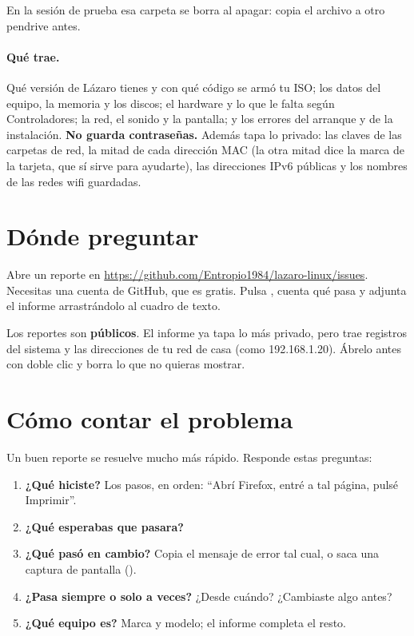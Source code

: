 En la sesión de prueba esa carpeta se borra al apagar: copia el archivo a
otro pendrive antes.

\paragraph{Qué trae.} Qué versión de Lázaro tienes y con qué código se
armó tu ISO; los datos del equipo, la memoria y los discos; el hardware y
lo que le falta según Controladores; la red, el sonido y la pantalla; y
los errores del arranque y de la instalación. \textbf{No guarda
contraseñas.} Además tapa lo privado: las claves de las carpetas de red,
la mitad de cada dirección MAC (la otra mitad dice la marca de la
tarjeta, que sí sirve para ayudarte), las direcciones IPv6 públicas y los
nombres de las redes wifi guardadas.

\section{Dónde preguntar}

Abre un reporte en \url{https://github.com/Entropio1984/lazaro-linux/issues}.
Necesitas una cuenta de GitHub, que es gratis. Pulsa ,
cuenta qué pasa y adjunta el informe arrastrándolo al cuadro de texto.

\begin{cuidado}
Los reportes son \textbf{públicos}. El informe ya tapa lo más privado,
pero trae registros del sistema y las direcciones de tu red de casa (como
192.168.1.20). Ábrelo antes con doble clic y borra lo que no quieras
mostrar.
\end{cuidado}

\section{Cómo contar el problema}

Un buen reporte se resuelve mucho más rápido. Responde estas preguntas:
\begin{enumerate}
  \item \textbf{¿Qué hiciste?} Los pasos, en orden: \enquote{Abrí Firefox,
        entré a tal página, pulsé Imprimir}.
  \item \textbf{¿Qué esperabas que pasara?}
  \item \textbf{¿Qué pasó en cambio?} Copia el mensaje de error tal cual,
        o saca una captura de pantalla ().
  \item \textbf{¿Pasa siempre o solo a veces?} ¿Desde cuándo? ¿Cambiaste
        algo antes?
  \item \textbf{¿Qué equipo es?} Marca y modelo; el informe completa el
        resto.
\end{enumerate}

